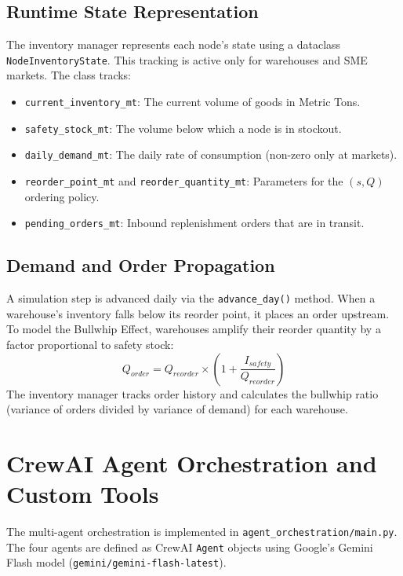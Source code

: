 \subsection{Runtime State Representation}
The inventory manager represents each node's state using a dataclass \texttt{NodeInventoryState}. This tracking is active only for warehouses and SME markets. The class tracks:
\begin{itemize}
    \item \texttt{current\_inventory\_mt}: The current volume of goods in Metric Tons.
    \item \texttt{safety\_stock\_mt}: The volume below which a node is in stockout.
    \item \texttt{daily\_demand\_mt}: The daily rate of consumption (non-zero only at markets).
    \item \texttt{reorder\_point\_mt} and \texttt{reorder\_quantity\_mt}: Parameters for the $(s, Q)$ ordering policy.
    \item \texttt{pending\_orders\_mt}: Inbound replenishment orders that are in transit.
\end{itemize}

\subsection{Demand and Order Propagation}
A simulation step is advanced daily via the \texttt{advance\_day()} method. When a warehouse's inventory falls below its reorder point, it places an order upstream. To model the Bullwhip Effect, warehouses amplify their reorder quantity by a factor proportional to safety stock:
\begin{equation}
    Q_{order} = Q_{reorder} \times \left(1 + \frac{I_{safety}}{Q_{reorder}}\right)
\end{equation}
The inventory manager tracks order history and calculates the bullwhip ratio (variance of orders divided by variance of demand) for each warehouse.

\section{CrewAI Agent Orchestration and Custom Tools}
The multi-agent orchestration is implemented in \texttt{agent\_orchestration/main.py}. The four agents are defined as CrewAI \texttt{Agent} objects using Google's Gemini Flash model (\texttt{gemini/gemini-flash-latest}).

